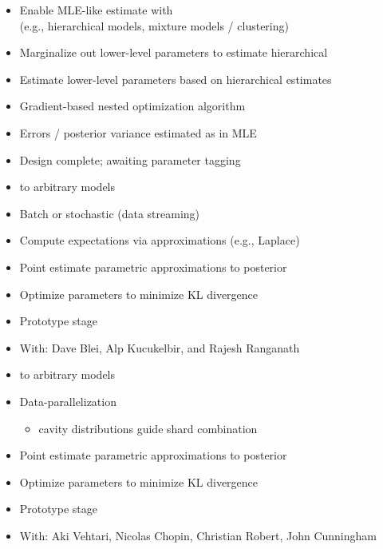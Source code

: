 \documentclass[10pt]{report}
\newcommand{\sld}[1]{\newpage{\noindent\LARGE \ \ \
    \textcolor{MidnightBlue}{\bfseries #1}}\vspace*{4pt}}
\newcommand{\myemph}[1]{{\color{MidnightBlue}{\bfseries #1}}}
\begin{document}
\sld{\Large Marginal Maximum Likelihood (MML)}
\begin{itemize}
\item Enable MLE-like estimate with \myemph{infinite likelihoods}
\\ {\small (e.g., hierarchical models, mixture models / clustering)}
\item Marginalize out lower-level parameters to estimate hierarchical
\item Estimate lower-level parameters based on hierarchical estimates
\item Gradient-based nested optimization algorithm
\item Errors / posterior variance estimated as in MLE
\vfill
\item Design complete; awaiting parameter tagging
\end{itemize}

\sld{Variational Bayes (VB)}
\begin{itemize}
\item \myemph{Black box} to \myemph{scale} arbitrary models
\item Batch or stochastic (data streaming)
\item Compute expectations via approximations (e.g., Laplace)
\item Point estimate parametric approximations to posterior
\item Optimize parameters to minimize KL divergence
\vfill
\item Prototype stage 
\item {\footnotesize With: Dave Blei, Alp Kucukelbir, and Rajesh Ranganath}
\end{itemize}

\sld{Expectation Propagation (EP)}
\begin{itemize}
\item \myemph{Black box} to \myemph{scale} arbitrary models
\item Data-parallelization
\vspace*{-4pt}
\begin{itemize}\small
\item cavity distributions guide shard combination
\end{itemize}
\item Point estimate parametric approximations to posterior
\item Optimize parameters to minimize KL divergence
\vfill
\item Prototype stage
\item {\footnotesize With: Aki Vehtari, Nicolas Chopin, Christian Robert,
  John Cunningham}
\end{itemize}
\end{document}
